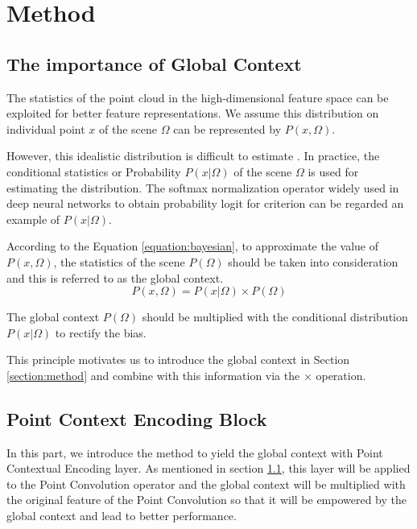 \documentclass[runningheads]{llncs}
\begin{document}
\section{Method}

\subsection{The importance of Global Context}
\label{sec:bayesian}
The statistics of the  point cloud in the  high-dimensional feature space can be exploited for better  feature representations. We assume this  distribution  on individual point $x$ of the scene $\Omega$ can be represented by $P(x,\Omega)$. 

However, this idealistic distribution is difficult to estimate . In practice,  the conditional statistics or Probability $P(x|\Omega)$  of the scene $\Omega$ is used  for estimating the  distribution.  The softmax normalization operator widely used in deep neural networks to obtain probability logit for criterion can be regarded an example of  $P(x|\Omega)$.

According to the  Equation \ref{equation:bayesian}, to approximate the value of $P(x,\Omega)$, the statistics of the scene $P(\Omega)$ should be taken into consideration and this is referred to as the global context.
\begin{equation}
   P(x,\Omega) = P(x|\Omega)\times P(\Omega)
   \label{equation:bayesian}
\end{equation}

The global context $P(\Omega)$ should be multiplied with the conditional distribution $P(x|\Omega)$ to rectify the bias. 

This principle %
motivates us to introduce the global context in Section \ref{section:method} and combine with this information via  the $\times$ operation.

\subsection{Point Context Encoding Block}

In this part, we introduce the  method  to yield  the global context with Point Contextual Encoding layer. As mentioned in section \ref{sec:bayesian}, this layer will be applied to  
the Point Convolution operator and the global context will be multiplied with the original feature of the Point Convolution so that it will be empowered by the global context and lead to better performance. 
\end{document}
